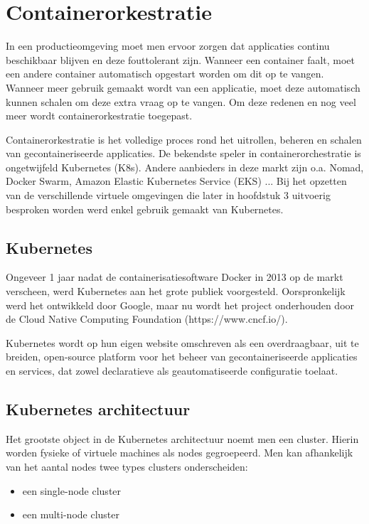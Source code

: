 \section{Containerorkestratie}

In een productieomgeving moet men ervoor zorgen dat applicaties continu beschikbaar blijven en deze fouttolerant zijn. Wanneer een container faalt, moet een andere container automatisch opgestart worden om dit op te vangen. Wanneer meer gebruik gemaakt wordt van een applicatie, moet deze automatisch kunnen schalen om deze extra vraag op te vangen. Om deze redenen en nog veel meer wordt containerorkestratie toegepast.

Containerorkestratie is het volledige proces rond het uitrollen, beheren en schalen van gecontaineriseerde applicaties. De bekendste speler in containerorchestratie is ongetwijfeld Kubernetes (K8s). Andere aanbieders in deze markt zijn o.a. Nomad, Docker Swarm, Amazon Elastic Kubernetes Service (EKS) ...
Bij het opzetten van de verschillende virtuele omgevingen die later in hoofdstuk 3 uitvoerig besproken worden werd enkel gebruik gemaakt van Kubernetes.

\subsection{Kubernetes} 

Ongeveer 1 jaar nadat de containerisatiesoftware Docker in 2013 op de markt verscheen, werd Kubernetes aan het grote publiek voorgesteld. Oorspronkelijk werd het ontwikkeld door Google, maar nu wordt het project onderhouden door de Cloud Native Computing Foundation (https://www.cncf.io/).

Kubernetes wordt op hun eigen website omschreven als een overdraagbaar, uit te breiden, open-source platform voor het beheer van gecontaineriseerde applicaties en services, dat zowel declaratieve als geautomatiseerde configuratie toelaat.

\subsection{Kubernetes architectuur}

Het grootste object in de Kubernetes architectuur noemt men een cluster. Hierin worden fysieke of virtuele machines als nodes gegroepeerd. Men kan afhankelijk van het aantal nodes twee types clusters onderscheiden:

\begin{itemize}
    \item een single-node cluster 
    \item een multi-node cluster 
\end{itemize} 

